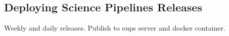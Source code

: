 \subsection{Deploying Science Pipelines Releases}

Weekly and daily releases. \label{sec:releases_weekly}\label{sec:releases_daily} Publish to eups server and docker container.
